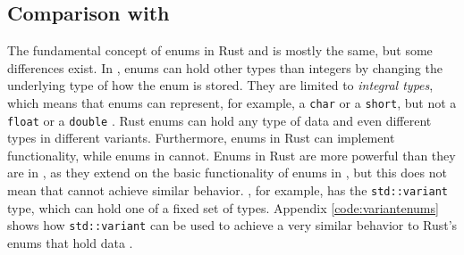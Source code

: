 \subsection{Comparison with \Cpp}
The fundamental concept of enums in Rust and \Cpp is mostly the same, but some differences exist.
In \Cpp, enums can hold other types than integers by changing the underlying type of how the enum is stored.
They are limited to \textit{integral types}, which means that enums can represent, for example, a \texttt{char} or a \texttt{short}, but not a \texttt{float} or a \texttt{double} \cite[32, 834]{Lippman_Stanley_B_2012-08-06}.
Rust enums can hold any type of data and even different types in different variants.
Furthermore, enums in Rust can implement functionality, while enums in \Cpp cannot.
Enums in Rust are more powerful than they are in \Cpp, as they extend on the basic functionality of enums in \Cpp, but this does not mean that \Cpp cannot achieve similar behavior.
\Cpp, for example, has the \texttt{std::variant} type, which can hold one of a fixed set of types.
Appendix \ref{code:variantenums} shows how \texttt{std::variant} can be used to achieve a very similar behavior to Rust's enums that hold data \cite[209-210]{Stroustrup_Bjarne2022-09-24}.
